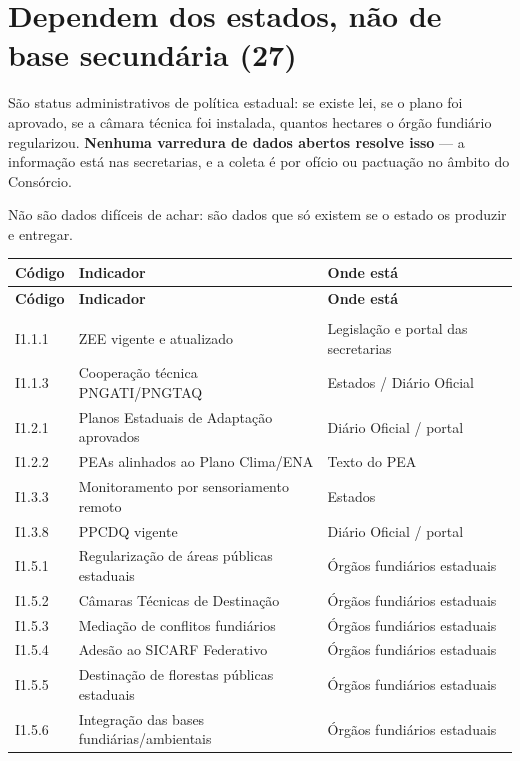 \documentclass[11pt,a4paper]{article}
\begin{document}
\vfill
\tableofcontents
\newpage

\section{Dependem dos estados, não de base secundária (27)}

São status administrativos de política estadual: se existe lei, se o plano foi
aprovado, se a câmara técnica foi instalada, quantos hectares o órgão fundiário
regularizou. \textbf{Nenhuma varredura de dados abertos resolve isso} --- a informação
está nas secretarias, e a coleta é por ofício ou pactuação no âmbito do Consórcio.

Não são dados difíceis de achar: são dados que só existem se o estado os produzir e
entregar.

\begin{longtable}{L{1.5cm} L{7.1cm} L{5.9cm}}
\toprule
\textbf{Código} & \textbf{Indicador} & \textbf{Onde está} \\
\midrule
\endfirsthead
\toprule
\textbf{Código} & \textbf{Indicador} & \textbf{Onde está} \\
\midrule
\endhead
\bottomrule
\endfoot
{} \\[0.3em]
I1.1.1 & ZEE vigente e atualizado & Legislação e portal das secretarias \\
I1.1.3 & Cooperação técnica PNGATI/PNGTAQ & Estados / Diário Oficial \\
I1.2.1 & Planos Estaduais de Adaptação aprovados & Diário Oficial / portal \\
I1.2.2 & PEAs alinhados ao Plano Clima/ENA & Texto do PEA \\
I1.3.3 & Monitoramento por sensoriamento remoto & Estados \\
I1.3.8 & PPCDQ vigente & Diário Oficial / portal \\
I1.5.1 & Regularização de áreas públicas estaduais & Órgãos fundiários estaduais \\
I1.5.2 & Câmaras Técnicas de Destinação & Órgãos fundiários estaduais \\
I1.5.3 & Mediação de conflitos fundiários & Órgãos fundiários estaduais \\
I1.5.4 & Adesão ao SICARF Federativo & Órgãos fundiários estaduais \\
I1.5.5 & Destinação de florestas públicas estaduais & Órgãos fundiários estaduais \\
I1.5.6 & Integração das bases fundiárias/ambientais & Órgãos fundiários estaduais \\

\end{longtable}
\end{document}
